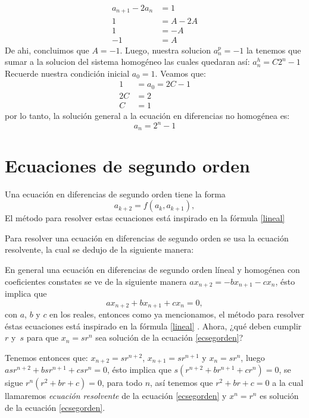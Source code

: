\documentclass{report}
\begin{document}
\begin{align*}
  a_{n+1}-2a_{n}&=1\\
  1&=A-2A\\
  1&=-A\\
  -1&=A
\end{align*}
De ahi, concluimos que $A=-1$.
Luego, nuestra solucion $a_n^p=-1$ la tenemos que sumar a la solucion del sistema homogéneo las cuales quedaran así:
$a_{n}^h=C2^n-1$
Recuerde nuestra condición inicial $a_{0}=1$. Veamos que:
\begin{align*}
1&=a_{0}=2C-1\\
2C&=2\\
  C&=1
\end{align*}  
por lo tanto, la solución general a la ecuación en diferencias no homogénea es:
$$a_{n}=2^n-1$$


\chapter{Ecuaciones de segundo orden}

Una ecuación en diferencias de segundo orden tiene la forma
\begin{equation}
  \label{ecsegorden1}
  a_{k+2}=f(a_k,a_{k+1}),
\end{equation}
El método para resolver estas ecuaciones está inspirado en la fórmula \eqref{lineal} 

Para resolver una ecuación en diferencias de segundo orden se usa la
ecuación resolvente, la cual se dedujo de la siguiente manera:

En general una ecuación en diferencias de segundo orden líneal y homogénea con coeficientes constates se ve de la
siguiente manera $ax_{n+2}=-bx_{n+1}-cx_{n}$, ésto implica que
\begin{equation}
  \label{ecsegorden}
  ax_{n+2}+bx_{n+1}+cx_{n}=0,
\end{equation}
con $a$, $b$ y $c$ en los reales, entonces como ya mencionamos, el método
para resolver éstas ecuaciones está inspirado en la fórmula \eqref{lineal}
. Ahora, ¿qué deben cumplir $r$ y~$s$ para que $x_n=sr^n$
sea solución de la ecuación \eqref{ecsegorden}?

Tenemos entonces que: $x_{n+2}=sr^{n+2}$, $x_{n+1}=sr^{n+1}$ y
$x_{n}=sr^{n}$, luego $asr^{n+2}+bsr^{n+1}+csr^n=0$, ésto implica que
$s(r^{n+2}+br^{n+1}+cr^n)=0$, se sigue $r^n(r^2+br+c)=0$, para todo
$n$, así tenemos que $r^2+br+c=0$ a la cual llamaremos
\textit{ecuación resolvente} de la ecuación \eqref{ecsegorden} y
$x^n=r^n$ es solución de la ecuación \eqref{ecsegorden}.
\end{document}
